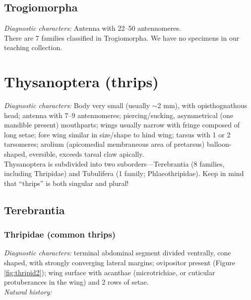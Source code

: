 \documentclass[letterpaper, 11pt]{article}
\begin{document}
\subsection{Trogiomorpha}
\noindent{}\textit{Diagnostic characters:} Antenna with 22--50 antennomeres.\\

\noindent{}There are 7 families classified in Trogiomorpha. We have no specimens in our teaching collection.\\

\section{Thysanoptera (thrips)}
\noindent{}\textit{Diagnostic characters:} Body very small (usually $\sim$2 mm), with opisthognathous head; antenna with 7--9 antennomeres; piercing/sucking, asymmetrical (one mandible present) mouthparts; wings usually narrow with fringe composed of long setae; fore wing similar in size/shape to hind wing; tarsus with 1 or 2 tarsomeres; arolium (apicomedial membraneous area of pretarsus) balloon-shaped, eversible, exceeds tarsal claw apically.\\

\noindent{}Thysanoptera is subdivided into two suborders---Terebrantia (8 families, including Thripidae) and Tubulifera (1 family; Phlaeothripidae). Keep in mind that ``thrips'' is both singular and plural!

\subsection{Terebrantia}
\subsubsection{Thripidae (common thrips)}
\noindent{}\textit{Diagnostic characters:} terminal abdominal segment divided ventrally, cone shaped, with strongly converging lateral margins; ovipositor present (Figure \ref{fig:thripid2}); wing surface with acanthae (microtrichiae, or cuticular protuberances in the wing) and 2 rows of setae. \\

\noindent{}\textit{Natural history:} \\
\end{document}
